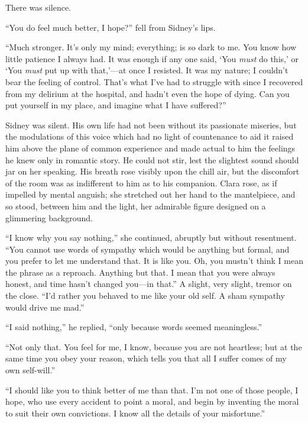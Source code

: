 There was silence.

``You do feel much better, I hope?'' fell from Sidney's lips.

``Much stronger. It's only my mind; everything; is so dark to me. You
know how little patience I always had. It was enough if any one said,
`You \emph{must} do this,' or `You \emph{must} put up with that,'---at
once I resisted. It was my nature; I couldn't bear the feeling of
control. That's what I've had to struggle with since I recovered from my
delirium at the hospital, and hadn't even the hope of dying. Can you put
yourself in my place, and imagine what I have suffered?''

Sidney was silent. His own life had not been without its passionate
miseries, but the modulations of this voice which had no light of
countenance to aid it raised him above the {}plane of common experience
and made actual to him the feelings he knew only in romantic story. He
could not stir, lest the slightest sound should jar on her speaking. His
breath rose visibly upon the chill air, but the discomfort of the room
was as indifferent to him as to his companion. Clara rose, as if
impelled by mental anguish; she stretched out her hand to the
mantelpiece, and so stood, between him and the light, her admirable
figure designed on a glimmering background.

``I know why you say nothing,'' she continued, abruptly but without
resentment. ``You cannot use words of sympathy which would be anything
but formal, and you prefer to let me understand that. It is like you.
Oh, you mustn't think I mean the phrase as a reproach. Anything but
that. I mean that you were always honest, and time hasn't changed
you---in that.'' A slight, very slight, tremor on the close. ``I'd
rather you behaved to me like your old self. A sham sympathy would drive
me mad.''

``I said nothing,'' he replied, ``only because words seemed
meaningless.''

``Not only that. You feel for me, I know, {}because you are not
heartless; but at the same time you obey your reason, which tells you
that all I suffer comes of my own self-will.''

``I should like you to think better of me than that. I'm not one of
those people, I hope, who use every accident to point a moral, and begin
by inventing the moral to suit their own convictions. I know all the
details of your misfortune.''

